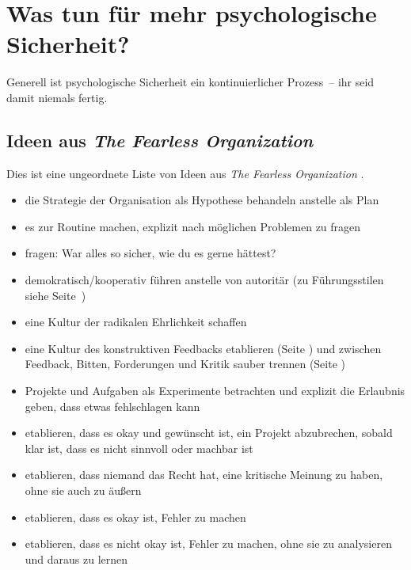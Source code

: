 \section{Was tun für mehr psychologische Sicherheit?}
\label{ws-was-tun}

Generell ist psychologische Sicherheit ein kontinuierlicher Prozess~-- ihr seid damit niemals \glqq fertig\grqq.

\subsection{Ideen aus \emph{The Fearless Organization}}

Dies ist eine ungeordnete Liste von Ideen aus \emph{The Fearless Organization} \cite{the-fearless-organisation}.

\begin{itemize}
    \item die Strategie der Organisation als Hypothese behandeln anstelle als Plan  
    \item es zur Routine machen, explizit nach möglichen Problemen zu fragen  
    \item fragen: \glqq War alles so sicher, wie du es gerne hättest?\grqq {}
    \item demokratisch/kooperativ führen anstelle von autoritär (zu Führungsstilen siehe Seite~\pageref{fuehrungsstile}) 
    \item eine Kultur der radikalen Ehrlichkeit \cite{radical-honesty} schaffen 
    \item eine Kultur des konstruktiven Feedbacks etablieren (Seite \pageref{feedback-regeln}) und zwischen Feedback, Bitten, Forderungen und Kritik sauber trennen  (Seite \pageref{feedback-vs-kritik})
    \item Projekte und Aufgaben als Experimente betrachten und explizit die Erlaubnis geben, dass etwas fehlschlagen kann 
    \item etablieren, dass es okay und gewünscht ist, ein Projekt abzubrechen, sobald klar ist, dass es nicht sinnvoll oder machbar ist 
    \item etablieren, dass niemand das Recht hat, eine kritische Meinung zu haben, ohne sie auch zu äußern
    \item etablieren, dass es okay ist, Fehler zu machen 
    \item etablieren, dass es nicht okay ist, Fehler zu machen, ohne sie zu analysieren und daraus zu lernen

\end{itemize}
